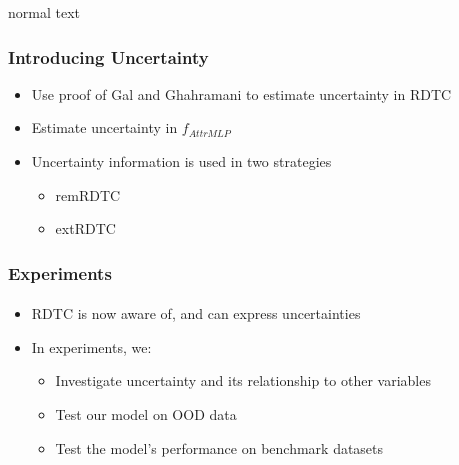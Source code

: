 \documentclass[9pt]{beamer}
\begin{document}
\begin{frame}{normal text}
\frametitle{Introducing Uncertainty}
\begin{itemize}
	\item Use proof of Gal and Ghahramani \cite{gal2016dropout} to estimate uncertainty in RDTC \cite{alaniz2019explainable}
	\item Estimate uncertainty in $f_{AttrMLP}$
	\item Uncertainty information is used in two strategies
	\begin{itemize}
		\item remRDTC
		\item extRDTC
	\end{itemize}
\end{itemize}
\end{frame}





\begin{frame}
\frametitle{Experiments}
\framesubtitle{}
\begin{itemize}
	\item RDTC is now aware of, and can express uncertainties
	\item In experiments, we:
	\begin{itemize}
		\item Investigate uncertainty and its relationship to other variables
		\item Test our model on OOD data
		\item Test the model's performance on benchmark datasets
	\end{itemize}
\end{itemize}
\end{frame}
\end{document}
